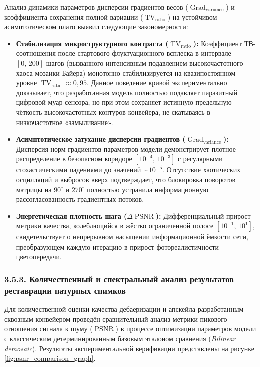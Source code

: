 \documentclass[12pt,a4paper]{article}
\begin{document}
Анализ динамики параметров дисперсии градиентов весов ($\operatorname{Grad}_{\operatorname{variance}}$) и коэффициента сохранения полной вариации ($\operatorname{TV}_{\operatorname{ratio}}$) на устойчивом асимптотическом плато выявил следующие закономерности:
\begin{itemize}
    \item \textbf{Стабилизация микроструктурного контраста ($\operatorname{TV}_{\operatorname{ratio}}$):} Коэффициент ТВ-соотношения после стартового флуктуационного всплеска в интервале $[0,\, 200]$ шагов (вызванного интенсивным подавлением высокочастотного хаоса мозаики Байера) монотонно стабилизируется на квазипостоянном уровне $\operatorname{TV}_{\operatorname{ratio}} \approx 0{,}95$. Данное поведение кривой экспериментально доказывает, что разработанная модель полностью подавляет паразитный цифровой муар сенсора, но при этом сохраняет истинную предельную чёткость высокочастотных контуров конвейера, не скатываясь в низкочастотное «замыливание».
    \item \textbf{Асимптотическое затухание дисперсии градиентов ($\operatorname{Grad}_{\operatorname{variance}}$):} Дисперсия норм градиентов параметров модели демонстрирует плотное распределение в безопасном коридоре $[10^{-4},\, 10^{-3}]$ с регулярными стохастическими падениями до значений $\sim 10^{-5}$. Отсутствие хаотических осцилляций и выбросов вверх подтверждает, что блокировка поворотов матрицы на $90^\circ$ и $270^\circ$ полностью устранила информационную рассогласованность градиентных потоков.
    \item \textbf{Энергетическая плотность шага ($\Delta\operatorname{PSNR}$):} Дифференциальный прирост метрики качества, колеблющийся в жёстко ограниченной полосе $[10^{-1},\, 10^1]$, свидетельствует о непрерывном насыщении информационной ёмкости сети, преобразующем каждую итерацию в прирост фотореалистичности цветопередачи.
\end{itemize}

\subsubsection{3.5.3. Количественный и спектральный анализ результатов реставрации натурных снимков}

Для количественной оценки качества дебаеризации и апскейла разработанным сквозным конвейером проведён сравнительный анализ метрики пикового отношения сигнала к шуму ($\operatorname{PSNR}$) в процессе оптимизации параметров модели с классическим детерминированным базовым эталоном сравнения (\textit{Bilinear demosaic}). Результаты экспериментальной верификации представлены на рисунке \ref{fig:psnr_comparison_graph}.
\end{document}
